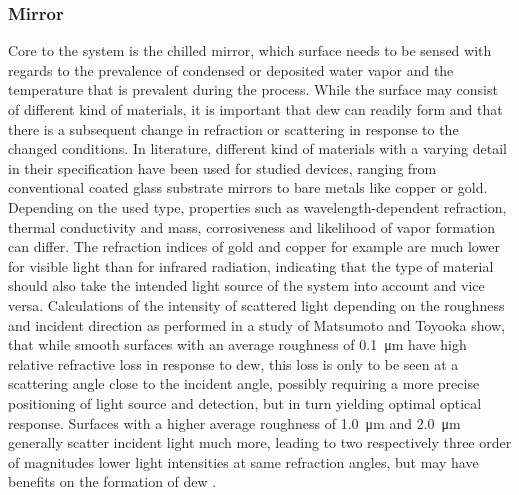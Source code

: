 \subsubsection{Mirror}\label{s:mirror}
Core to the system is the chilled mirror, which surface needs to be sensed with regards to the prevalence of condensed or deposited water vapor and the temperature that is prevalent during the process. While the surface may consist of different kind of materials, it is important that dew can readily form and that there is a subsequent change in refraction or scattering in response to the changed conditions. In literature, different kind of materials with a varying detail in their specification have been used for studied devices, ranging from conventional coated glass substrate mirrors to bare metals like copper or gold. Depending on the used type, properties such as wavelength-dependent refraction, thermal conductivity and mass, corrosiveness and likelihood of vapor formation can differ. The refraction indices of gold and copper for example are much lower for visible light than for infrared radiation, indicating that the type of material should also take the intended light source of the system into account and vice versa. Calculations of the intensity of scattered light depending on the roughness and incident direction as performed in a study of Matsumoto and Toyooka show, that while smooth surfaces with an average roughness of \qty{0.1}{\micro\m} have high relative refractive loss in response to dew, this loss is only to be seen at a scattering angle close to the incident angle, possibly requiring a more precise positioning of light source and detection, but in turn yielding optimal optical response. Surfaces with a higher average roughness of \qty{1.0}{\micro\m} and \qty{2.0}{\micro\m} generally scatter incident light much more, leading to two respectively three order of magnitudes lower light intensities at same refraction angles, but may have benefits on the formation of dew \autocite{matsumotoDeterminationDewPoint1992a}.
\\

